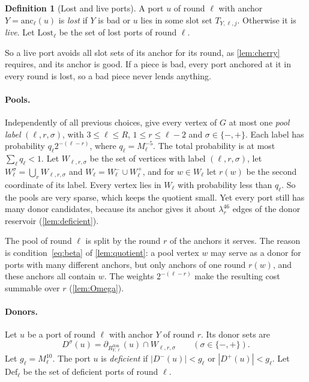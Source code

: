 \documentclass[11pt]{article}
\theoremstyle{definition}
\newtheorem{definition}[theorem]{Definition}
\theoremstyle{remark}
\numberwithin{equation}{section}
\numberwithin{figure}{section}
\numberwithin{table}{section}
\newcommand{\NN}{\partial}
\newcommand{\Lost}{\mathrm{Lost}}
\newcommand{\Def}{\mathrm{Def}}
\newcommand{\anc}{\mathrm{anc}}
\newcommand{\Rdon}{R^{\mathrm{don}}}
\begin{document}
\begin{definition}[Lost and live ports]\label{def:lost}
A port $u$ of round $\ell$ with anchor $Y=\anc_\ell(u)$ is \emph{lost} if $Y$ is
bad or $u$ lies in some slot set $T_{Y,\ell,j}$. Otherwise it is \emph{live}.
Let $\Lost_\ell$ be the set of lost ports of round $\ell$.
\end{definition}

So a live port avoids all slot sets of its anchor for its round, as
\cref{lem:cherry} requires, and its anchor is good. If a piece is bad, every
port anchored at it in every round is lost, so a bad piece never lends
anything.

\paragraph{Pools.} Independently of all previous choices, give every vertex of
$G$ at most one \emph{pool label} $(\ell,r,\sigma)$, with $3\le\ell\le R$,
$1\le r\le\ell-2$ and $\sigma\in\{-,+\}$. Each label has probability
$q_\ell2^{-(\ell-r)}$, where $q_\ell=M_\ell^{-5}$. The total probability is at
most $\sum_\ell q_\ell<1$. Let $W_{\ell,r,\sigma}$ be the set of vertices with
label $(\ell,r,\sigma)$, let $W_\ell^\sigma=\bigcup_rW_{\ell,r,\sigma}$ and
$W_\ell=W_\ell^-\cup W_\ell^+$, and for $w\in W_\ell$ let $r(w)$ be the second
coordinate of its label. Every vertex lies in $W_\ell$ with probability less
than $q_\ell$. So the pools are very sparse, which keeps the quotient small. Yet
every port still has many donor candidates, because its anchor gives it about
$\lambda_r^{46}$ edges of the donor reservoir (\cref{lem:deficient}).

The pool of round $\ell$ is split by the round $r$ of the anchors it serves.
The reason is condition~\eqref{eq:beta} of \cref{lem:quotient}: a pool vertex
$w$ may serve as a donor for ports with many different anchors, but only
anchors of one round $r(w)$, and these anchors all contain $w$. The weights
$2^{-(\ell-r)}$ make the resulting cost summable over $r$ (\cref{lem:Omega}).

\paragraph{Donors.} Let $u$ be a port of round $\ell$ with anchor $Y$ of round
$r$. Its donor sets are
\[
D^\sigma(u)=\NN_{\Rdon_{Y,\ell}}(u)\cap W_{\ell,r,\sigma}\qquad(\sigma\in\{-,+\}).
\]
Let $g_\ell=M_\ell^{10}$. The port $u$ is \emph{deficient} if
$|D^-(u)|<g_\ell$ or $|D^+(u)|<g_\ell$. Let $\Def_\ell$ be the set of deficient
ports of round $\ell$.
\end{document}
